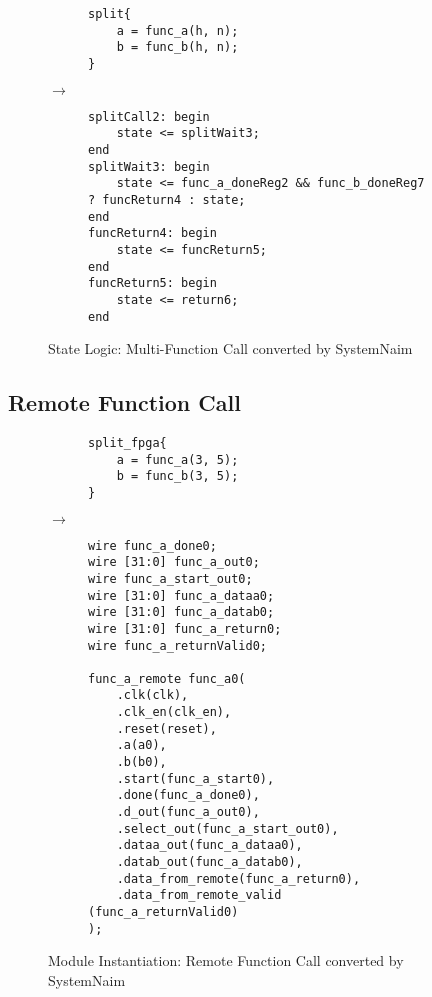 \begin{figure}[H]
\centering
\begin{subfigure}{0.32\textwidth}
    \centering
    \begin{verbatim}
split{
    a = func_a(h, n);
    b = func_b(h, n);
}
\end{verbatim}
\end{subfigure}%
{\LARGE$\rightarrow$}%
\begin{subfigure}{0.58\textwidth}
    \begin{verbatim}
splitCall2: begin
    state <= splitWait3;
end
splitWait3: begin
    state <= func_a_doneReg2 && func_b_doneReg7 ? funcReturn4 : state;
end
funcReturn4: begin
    state <= funcReturn5;
end
funcReturn5: begin
    state <= return6;
end
    \end{verbatim}
\end{subfigure}
\caption{State Logic: Multi-Function Call converted by SystemNaim}
\label{sn:multi_func_call_state}
\end{figure}

\subsection{Remote Function Call}

\begin{figure}[H]
\centering
\begin{subfigure}{0.32\textwidth}
    \centering
    \begin{verbatim}
split_fpga{
    a = func_a(3, 5);
    b = func_b(3, 5);
}
\end{verbatim}
\end{subfigure}%
{\LARGE$\rightarrow$}%
\begin{subfigure}{0.58\textwidth}
    \begin{verbatim}
wire func_a_done0;
wire [31:0] func_a_out0;
wire func_a_start_out0;
wire [31:0] func_a_dataa0;
wire [31:0] func_a_datab0;
wire [31:0] func_a_return0;
wire func_a_returnValid0;

func_a_remote func_a0(
    .clk(clk),
    .clk_en(clk_en),
    .reset(reset),
    .a(a0),
    .b(b0),
    .start(func_a_start0),
    .done(func_a_done0),
    .d_out(func_a_out0),
    .select_out(func_a_start_out0),
    .dataa_out(func_a_dataa0),
    .datab_out(func_a_datab0),
    .data_from_remote(func_a_return0),
    .data_from_remote_valid (func_a_returnValid0)
);
    \end{verbatim}
\end{subfigure}
\caption{Module Instantiation: Remote Function Call converted by SystemNaim}
\label{sn:rmt_func_call_mdl}
\end{figure}

